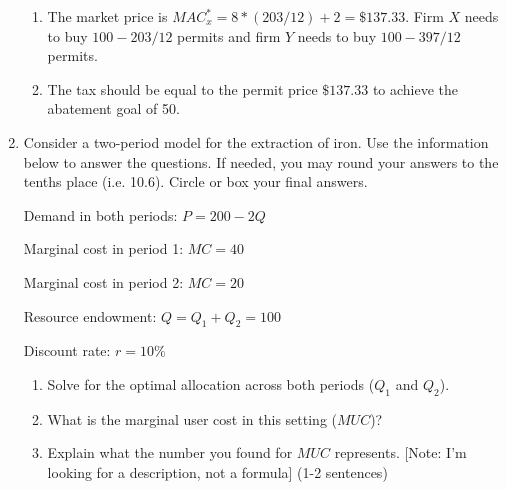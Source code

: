 \documentclass[11pt]{article}
\newcommand{\answer}[1]{\iftoggle{INCLUDEANSWERS}{{\color{violet!70!white}\textbf{Solution:} #1}}{}}
\newcommand{\points}[1]{\iftoggle{INCLUDEPOINTS}{{\color{blue!70!white}(#1 pts.)}}{}}
\begin{document}
\begin{enumerate}
{\begin{enumerate}
      \item The market price is $MAC_x^* = 8 * (203/12) + 2 = \$ 137.33$. Firm $X$ needs to buy $100 - 203/12$ permits and firm $Y$ needs to buy $100 - 397/12$ permits.
      
      \item The tax should be equal to the permit price $\$ 137.33$ to achieve the abatement goal of 50. 
    \end{enumerate}
  }

  \item Consider a two-period model for the extraction of iron. Use the information below to answer the questions. If needed, you may round your answers to the tenths place (i.e. 10.6). Circle or box your final answers.

  Demand in both periods: $P = 200 - 2Q$
  
  Marginal cost in period 1: $MC = 40$
  
  Marginal cost in period 2: $MC = 20$
  
  Resource endowment: $Q = Q_1 + Q_2 = 100$
  
  Discount rate: $r = 10\%$
  
  \begin{enumerate}
    \item \points{15} Solve for the optimal allocation across both periods ($Q_1$ and $Q_2$).
    \item \points{5} What is the marginal user cost in this setting ($MUC$)?
    \item \points{10} Explain what the number you found for $MUC$ represents. [Note: I’m looking for a description, not a formula] (1-2 sentences)  
  \end{enumerate}

  \answer{
    \begin{enumerate}
      \item $MUC_1 = 200 - 2Q_1 - 40 = 160 - 2Q_1$ and $MUC_2 = \frac{200 - 2Q_2 - 20}{1.1} = 200/1.1 - 2/1.1 Q_2$
      
      Then, putting $160 - 2Q_1 = 200/1.1 - 2/1.1 Q_2$ and $Q_1 + Q_2 = 100$ yields  
      $$
        Q_1^* = 880/21 \text{ and } Q_2^* = 1220/21.
      $$

      \item $MUC_1^* = 200 - 2Q_1^* = 2440/21 = MUC_2^*$. 
      
      \item If the miner could have one more unit of iron, it would be worth $2440/21$ or about \$116 dollars. That is the most the miner would pay to access one additional unit of the resource.
    \end{enumerate}
  }
\end{enumerate}
\end{document}

